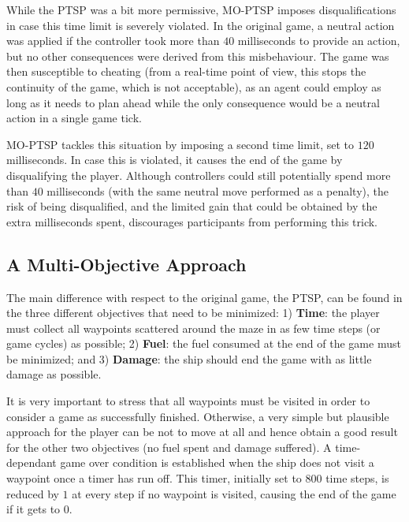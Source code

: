 \documentclass[conference]{IEEEtran}
\begin{document}
While the PTSP was a bit more permissive, MO-PTSP imposes disqualifications in case this time limit is severely violated. In the original game, a neutral action was applied if the controller took more than $40$ milliseconds to provide an action, but no other consequences were derived from this misbehaviour. The game was then susceptible to cheating (from a real-time point of view, this stops the continuity of the game, which is not acceptable), as an agent could employ as long as it needs to plan ahead while the only consequence would be a neutral action in a single game tick.  

MO-PTSP tackles this situation by imposing a second time limit, set to $120$ milliseconds. In case this is violated, it causes the end of the game by disqualifying the player. Although controllers could still potentially spend more than $40$ milliseconds (with the same neutral move performed as a penalty), the risk of being disqualified, and the limited gain that could be obtained by the extra milliseconds spent, discourages participants from performing this trick.

\subsection{A Multi-Objective Approach}

The main difference with respect to the original game, the PTSP, can be found in the three different objectives that need to be minimized: 1) \textbf{Time}: the player must collect all waypoints scattered around the maze in as few time steps (or game cycles) as possible; 2) \textbf{Fuel}: the fuel consumed at the end of the game must be minimized; and 3) \textbf{Damage}: the ship should end the game with as little damage as possible.

It is very important to stress that all waypoints must be visited in order to consider a game as successfully finished. Otherwise, a very simple but plausible approach for the player can be not to move at all and hence obtain a good result for the other two objectives (no fuel spent and damage suffered). A time-dependant game over condition is established when the ship does not visit a waypoint once a timer has run off. This timer, initially set to $800$ time steps, is reduced by $1$ at every step if no waypoint is visited, causing the end of the game if it gets to $0$.%
\end{document}
